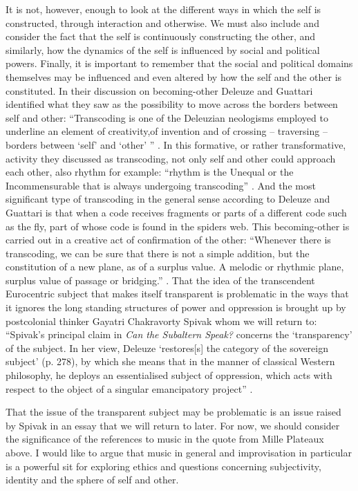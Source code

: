 \documentclass[a4paper]{article}
\begin{document}
It is not, however, enough to look at the different ways in which the self is constructed, through interaction and otherwise. We must also include and consider the fact that the self is continuously constructing the other, and similarly, how the dynamics of the self is influenced by social and political powers. Finally, it is important to remember that the social and political domains themselves may be influenced and even altered by how the self and the other is constituted. In their discussion on becoming-other Deleuze and Guattari identified what they saw as the possibility to move across the borders between self and other: ``Transcoding is one of the Deleuzian neologisms employed to underline an element of creativity,of invention and of crossing – traversing – borders between `self' and `other' '' \citep[p. 140][]{semetsky2011}. In this formative, or rather transformative, activity they discussed as transcoding, not only self and other could approach each other, also rhythm for example: ``rhythm is the Unequal or the Incommensurable that is always undergoing transcoding'' \citep[p. 346][]{deleuze80}. And the most significant type of transcoding in the general sense according to Deleuze and Guattari is that when a code receives fragments or parts of a different code such as the fly, part of whose code is found in the spiders web. This becoming-other is carried out in a creative act of confirmation of the other: ``Whenever there is transcoding, we can be sure that there is not a simple addition, but the constitution of a new plane, as of a surplus value. A melodic or rhythmic plane, surplus value of passage or bridging.'' \citep[p. 346]{deleuze80}. That the idea of the transcendent Eurocentric subject that makes itself transparent is problematic in the ways that it ignores the long standing structures of power and oppression is brought up by postcolonial thinker Gayatri Chakravorty Spivak whom we will return to: ``Spivak's principal claim in \emph{Can the Subaltern Speak?} concerns the `transparency' of the subject. In her view, Deleuze `restores[s] the category of the sovereign subject' (p. 278), by which she means that in the manner of classical Western philosophy, he deploys an essentialised subject of oppression, which acts with respect to the object of a singular emancipatory project'' \citep[][(citations from Spivak (1988))]{robinson2010}.

That the issue of the transparent subject may be problematic is an issue raised by Spivak in an essay that we will return to later. For now, we should consider the significance of the references to music in the quote from Mille Plateaux above. I would like to argue that music in general and improvisation in particular is a powerful sit for exploring ethics and questions concerning subjectivity, identity and the sphere of self and other.
\end{document}
